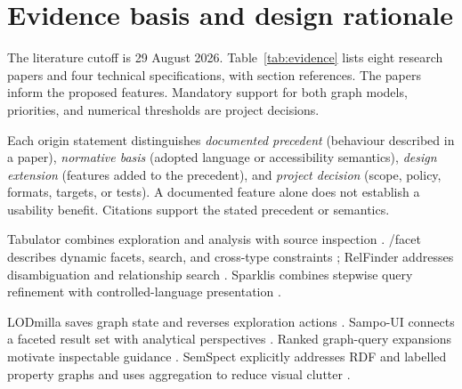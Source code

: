\documentclass[11pt,a4paper]{article}
\begin{document}
\section{Evidence basis and design rationale}
The literature cutoff is 29 August 2026. Table~\ref{tab:evidence} lists eight research papers and four technical specifications, with section references. The papers inform the proposed features. Mandatory support for both graph models, priorities, and numerical thresholds are project decisions.

Each origin statement distinguishes \emph{documented precedent} (behaviour described in a paper), \emph{normative basis} (adopted language or accessibility semantics), \emph{design extension} (features added to the precedent), and \emph{project decision} (scope, policy, formats, targets, or tests). A documented feature alone does not establish a usability benefit. Citations support the stated precedent or semantics.

Tabulator combines exploration and analysis with source inspection \citep[Sections 3.1--3.4]{tabulator}. /facet describes dynamic facets, search, and cross-type constraints \citep[Sections 3--4]{facet}; RelFinder addresses disambiguation and relationship search \citep[Sections 2.1--2.3]{relfinder}. Sparklis combines stepwise query refinement with controlled-language presentation \citep[Sections 3 and 5]{sparklis}.

LODmilla saves graph state and reverses exploration actions \citep[Section 3.1]{lodmilla}. Sampo-UI connects a faceted result set with analytical perspectives \citep[Sections 3.1--3.2 and 4.4--4.5]{sampoui}. Ranked graph-query expansions motivate inspectable guidance \citep[Sections 3--4]{suggestions}. SemSpect explicitly addresses RDF and labelled property graphs and uses aggregation to reduce visual clutter \citep[Abstract and Sections 1--2]{semspect}.
\end{document}

